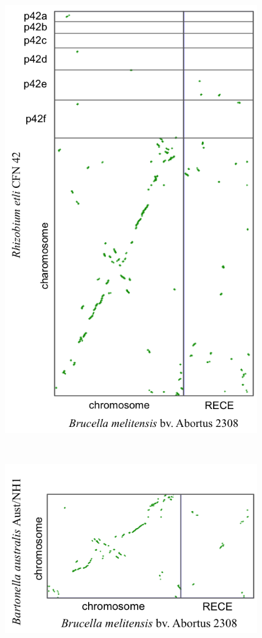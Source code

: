 \begin{figure}[H]
\begin{center}
\begin{minipage}{0.5\textwidth}
		\includegraphics[width=\textwidth]{./img/synteny/new/fig8_8e.png}
		\label{figsyntbruc5}
	\end{minipage}
\\
\centering
	\begin{minipage}{0.5\textwidth}
		\includegraphics[width=\textwidth]{./img/synteny/new/fig8_8a.png}

\end{minipage}
\end{center}
\end{figure}
